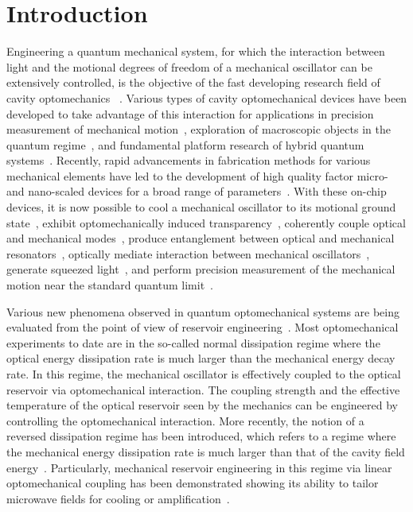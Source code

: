 \documentclass[pra,aps,showpacs,twocolumn,floatfix, superscriptaddress, nofootinbib, nobibnotes]{revtex4-1}
\begin{document}
\section{Introduction}
Engineering a quantum mechanical system, for which the interaction between light and the motional degrees of freedom of a mechanical oscillator can be extensively controlled, is the objective of the fast developing research field of cavity optomechanics ~\cite{ANDP:ANDP201200226, RevModPhys.86.1391, Milburn_optomechanics_book}. Various types of cavity optomechanical devices have been developed to take advantage of this interaction for applications in precision measurement of mechanical motion~\cite{Purdy801,  Schreppler1486}, exploration of macroscopic objects in the quantum regime~\cite{PhysRevA.84.052121}, and fundamental platform research of hybrid quantum systems~\cite{PhysRevLett.107.223001, PhysRevLett.112.133603}.
Recently, rapid advancements in fabrication methods for various mechanical elements have led to the development of high quality factor micro- and nano-scaled devices for a broad range of parameters~\cite{ANDP:ANDP201200226, RevModPhys.86.1391}. With these on-chip devices, it is now possible to cool a mechanical oscillator to its motional ground state~\cite{Teufel:2011aa, Chan:2011aa}, exhibit optomechanically induced transparency~\cite{PhysRevA.81.041803, Weis1520}, coherently couple optical and mechanical modes~\cite{Verhagen:2012aa}, produce entanglement between optical and mechanical resonators~\cite{Palomaki710}, optically mediate interaction between mechanical oscillators~\cite{PhysRevLett.112.013602, Spethmann:2016aa}, generate squeezed light~\cite{Brooks:2012aa, Safavi-Naeini:2013aa, PhysRevX.3.031012}, and perform precision measurement of the mechanical motion near the standard quantum limit~\cite{Schreppler1486}.

Various new phenomena observed in quantum optomechanical systems are being evaluated from the point of view of reservoir engineering~\cite{PhysRevLett.77.4728, PhysRevLett.107.080503, Kienzler53}. 
Most optomechanical experiments to date are in the so-called normal dissipation regime where the optical energy dissipation rate is much larger than the mechanical energy decay rate. 
In this regime, the mechanical oscillator is effectively coupled to the optical reservoir via optomechanical interaction. The coupling strength and the effective temperature of the optical reservoir seen by the mechanics can be engineered by controlling the optomechanical interaction. More recently, the notion of a reversed dissipation regime has been introduced, which refers to a regime where the mechanical energy dissipation rate is much larger than that of the cavity field energy~\cite{PhysRevLett.113.023604}. Particularly, mechanical reservoir engineering in this regime via linear optomechanical coupling has been demonstrated showing its ability to tailor microwave fields for cooling or amplification~\cite{Toth:2017aa}.
\end{document}
